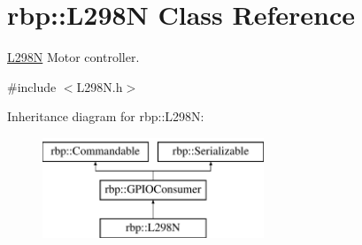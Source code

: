 \hypertarget{classrbp_1_1L298N}{}\section{rbp\+:\+:L298\+N Class Reference}
\label{classrbp_1_1L298N}


\hyperlink{classrbp_1_1L298N}{L298\+N} Motor controller.  




{\ttfamily \#include $<$L298\+N.\+h$>$}

Inheritance diagram for rbp\+:\+:L298\+N\+:\begin{figure}[H]
\begin{center}
\leavevmode
\includegraphics[height=3.000000cm]{classrbp_1_1L298N}
\end{center}
\end{figure}
